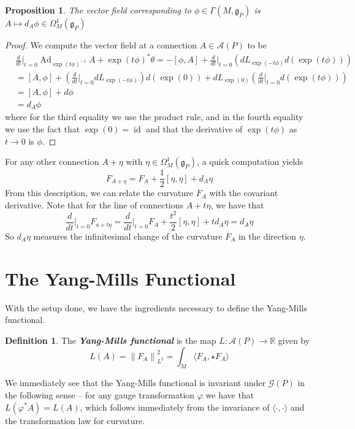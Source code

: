 \documentclass[psamsfonts, 12pt]{amsart}
\newtheorem{prop}[thm]{Proposition}
\theoremstyle{definition}
\newtheorem{defn}[thm]{Definition}
\theoremstyle{remark}
\newcommand{\R}{\mathbb{R}}
\newcommand{\ib}[1]{\textbf{\textit{#1}}}
\newcommand{\g}{\mathfrak{g}}
\newcommand{\inv}{^{-1}}
\newcommand{\norm}[1]{\left\lVert#1\right\rVert}
\DeclareMathOperator{\id}{id}
\DeclareMathOperator{\Ad}{Ad}
\begin{document}
%
\begin{prop}
The vector field corresponding to $\phi \in \Gamma(M,\g_P)$ is
$A \mapsto d_A\phi \in \Omega_M^1(\g_P)$
\end{prop}
%
\begin{proof}
We compute the vector field at a connection $A \in \mathscr{A}(P)$ to be
\begin{align*}
&\frac{d}{dt}\bigg\vert_{t=0} \Ad_{\exp(t\phi)\inv} A + \exp(t\phi)^*\theta
= -[\phi, A] + \frac{d}{dt}\bigg\vert_{t=0}(dL_{\exp(-t\phi)} d(\exp(t\phi))) \\
&= [A,\phi] + \left(\frac{d}{dt}\bigg\vert_{t=0} dL_{\exp(-t\phi)}\right)d(\exp(0))
+ dL_{\exp(0)}\left(\frac{d}{dt}\bigg\vert_{t=0}d(\exp(t\phi))\right) \\[5pt]
&= [A,\phi] + d\phi\\
&= d_A\phi
\end{align*}
where for the third equality we use the product rule, and in the fourth equality
we use the fact that $\exp(0) = \id$ and that the derivative of
$\exp(t\phi)$ as $t \to 0$ is $\phi$.
\end{proof}
%
For any other connection $A + \eta$ with $\eta \in \Omega^1_M(\g_P)$,
a quick computation yields
\[
F_{A+\eta} = F_A + \frac{1}{2}[\eta,\eta] + d_A\eta
\]
From this description, we can relate the curvature $F_A$ with the covariant derivative.
Note that for the line of connections $A + t\eta$, we have that
\[
\frac{d}{dt}\bigg\vert_{t=0} F_{a+t\eta} =
\frac{d}{dt}\bigg\vert_{t=0} F_A + \frac{t^2}{2}[\eta,\eta] + td_A\eta
= d_A\eta
\]
So $d_A\eta$ measures the infinitesimal change of the curvature $F_A$ in the direction
$\eta$.
%
\section{The Yang-Mills Functional}
%
With the setup done, we have the ingredients necessary to define the Yang-Mills
functional.
%
\begin{defn}
The \ib{Yang-Mills functional} is the map
$L : \mathscr{A}(P) \to \R$ given by
\[
L(A) = \norm{F_A}_{L^2}^2 = \int_M \langle F_A,\star F_A \rangle
\]
\end{defn}
%
We immediately see that the Yang-Mills functional is invariant under $\mathscr{G}(P)$
in the following sense -- for any gauge transformation $\varphi$ we have that
$L(\varphi^*A) = L(A)$, which follows immediately from the invariance of
$\langle\cdot,\cdot\rangle$ and the transformation law for curvature. \\
\end{document}
